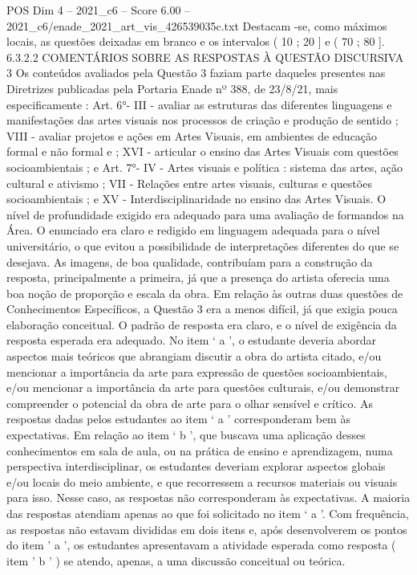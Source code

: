 \begin{textsample}{POS Dim 4 – 2021\_c6 – Score 6.00 – 2021\_c6/enade\_2021\_art\_vis\_426539035c.txt}
Destacam -se, como máximos locais, as questões deixadas em branco e os intervalos ( 10 ; 20 ] e ( 70 ; 80 ]. 6.3.2.2 COMENTÁRIOS SOBRE AS RESPOSTAS À QUESTÃO DISCURSIVA 3 Os conteúdos avaliados pela Questão 3 faziam parte daqueles presentes nas Diretrizes publicadas pela Portaria Enade nº 388, de 23/8/21, mais especificamente : Art. 6{\EmojiFont °}- III - avaliar as estruturas das diferentes linguagens e manifestações das artes visuais nos processos de criação e produção de sentido ; VIII - avaliar projetos e ações em Artes Visuais, em ambientes de educação formal e não formal e ; XVI - articular o ensino das Artes Visuais com questões socioambientais ; e Art. 7{\EmojiFont °}- IV - Artes visuais e política : sistema das artes, ação cultural e ativismo ; VII - Relações entre artes visuais, culturas e questões socioambientais ; e XV - Interdisciplinaridade no ensino das Artes Visuais.
O nível de profundidade exigido era adequado para uma avaliação de formandos na Área.
O enunciado era claro e redigido em linguagem adequada para o nível universitário, o que evitou a possibilidade de interpretações diferentes do que se desejava.
As imagens, de boa qualidade, contribuíam para a construção da resposta, principalmente a primeira, já que a presença do artista oferecia uma boa noção de proporção e escala da obra.
Em relação às outras duas questões de Conhecimentos Específicos, a Questão 3 era a menos difícil, já que exigia pouca elaboração conceitual.
O padrão de resposta era claro, e o nível de exigência da resposta esperada era adequado.
No item ‘ a ’, o estudante deveria abordar aspectos mais teóricos que abrangiam discutir a obra do artista citado, e/ou mencionar a importância da arte para expressão de questões socioambientais, e/ou mencionar a importância da arte para questões culturais, e/ou demonstrar compreender o potencial da obra de arte para o olhar sensível e crítico.
As respostas dadas pelos estudantes ao item ‘ a ’ corresponderam bem às expectativas.
Em relação ao item ‘ b ’, que buscava uma aplicação desses conhecimentos em sala de aula, ou na prática de ensino e aprendizagem, numa perspectiva interdisciplinar, os estudantes deveriam explorar aspectos globais e/ou locais do meio ambiente, e que recorressem a recursos materiais ou visuais para isso.
Nesse caso, as respostas não corresponderam às expectativas.
A maioria das respostas atendiam apenas ao que foi solicitado no item ‘ a ’.
Com frequência, as respostas não estavam divididas em dois itens e, após desenvolverem os pontos do item ' a ', os estudantes apresentavam a atividade esperada como resposta ( item ' b ' ) se atendo, apenas, a uma discussão conceitual ou teórica.

\end{textsample}
